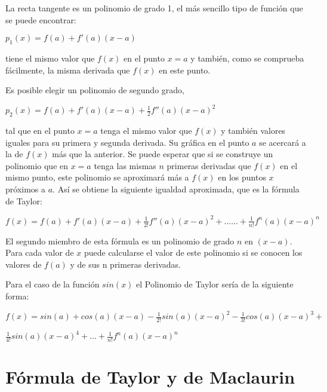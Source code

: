   La recta tangente es un polinomio de grado 1, el m\'as sencillo tipo de funci\'on que se puede encontrar:

 \begin{center}
$p_{1}(x) = f(a) + f ' (a) (x-a)$

\end{center}
  
tiene el mismo valor que $f(x)$ en el punto $x=a$ y tambi\'en, como se comprueba f\'acilmente, la misma derivada que $f(x)$ en este punto.
 
Es posible elegir un polinomio de segundo grado,
\begin{center}
$p_{2}(x) = f(a) + f ' (a) (x-a) + \frac{1}{2} f '' (a) (x-a) ^ 2$

\end{center}
tal que en el punto $x=a$ tenga el mismo valor que $f(x)$ y tambi\'en valores iguales para su primera y segunda derivada. Su gr\'afica en el punto $a$
se acercar\'a a la de $f(x)$ m\'as que la anterior. Se puede esperar que si se construye un polinomio que en $x=a$ tenga las mismas $n$ primeras derivadas
que $f(x)$ en el mismo punto, este polinomio se aproximar\'a más a $f(x)$ en los puntos $x$ pr\'oximos a $a$. As\'i se obtiene la siguiente igualdad aproximada,
que es la f\'ormula de Taylor:

\begin{center}
$f(x) = f(a) + f '(a) (x-a) + \frac{1}{2!} f '' (a) (x-a) ^ 2 + ...... + \frac{1}{n!} f ^ n(a) (x-a) ^ n$

\end{center}	
  El segundo miembro de esta f\'ormula es un polinomio de grado $n$ en $(x-a)$. Para cada valor de $x$ puede calcularse el valor de este polinomio si se
conocen los valores de $f(a)$ y de sus n primeras derivadas.

  Para el caso de la funci\'on $sin(x)$ el Polinomio de Taylor sería de la siguiente forma:

\begin{center}
$f(x) = sin(a) + cos(a) (x-a) - \frac{1}{2!} sin (a) (x-a) ^ 2 - \frac{1}{3!} cos (a) (x-a) ^3 +$

\end{center}

\begin{center}
$\frac{1}{4!} sin (a) (x-a) ^ 4 + ... + \frac{1}{n!} f ^ n(a) (x-a) ^ n$

\end{center}

\section{F\'ormula de Taylor y de Maclaurin}
\label{2:sec:3}

